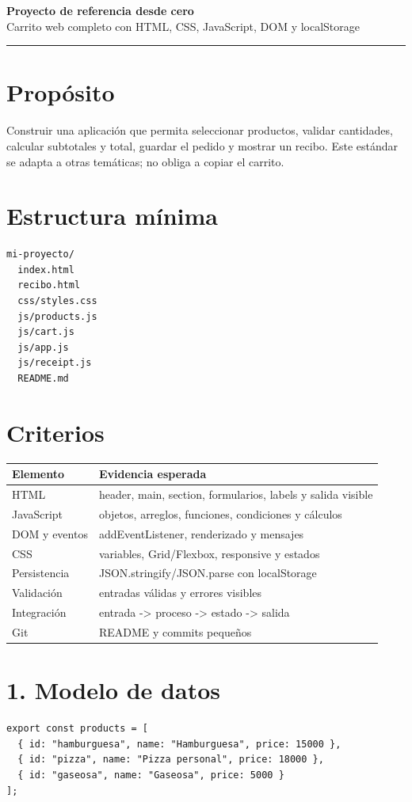 \documentclass[10pt,a4paper]{article}
\newcommand{\ruleline}{\par\noindent\color{line}\rule{\linewidth}{0.6pt}\color{black}\par}
\begin{document}
\begin{center}
{\color{navy}\Large\bfseries Proyecto de referencia desde cero}\\[2mm]
{\small Carrito web completo con HTML, CSS, JavaScript, DOM y localStorage}
\end{center}
\ruleline

\section*{Propósito}
Construir una aplicación que permita seleccionar productos, validar cantidades, calcular subtotales y total, guardar el pedido y mostrar un recibo. Este estándar se adapta a otras temáticas; no obliga a copiar el carrito.
\section*{Estructura mínima}
\begin{lstlisting}
mi-proyecto/
  index.html
  recibo.html
  css/styles.css
  js/products.js
  js/cart.js
  js/app.js
  js/receipt.js
  README.md
\end{lstlisting}
\section*{Criterios}
\begin{tabularx}{\linewidth}{>{\raggedright\arraybackslash}X X}
\toprule
\textbf{Elemento} & \textbf{Evidencia esperada}\\\midrule
HTML & header, main, section, formularios, labels y salida visible\\
JavaScript & objetos, arreglos, funciones, condiciones y cálculos\\
DOM y eventos & addEventListener, renderizado y mensajes\\
CSS & variables, Grid/Flexbox, responsive y estados\\
Persistencia & JSON.stringify/JSON.parse con localStorage\\
Validación & entradas válidas y errores visibles\\
Integración & entrada -> proceso -> estado -> salida\\
Git & README y commits pequeños\\
\bottomrule
\end{tabularx}

\newpage
\section*{1. Modelo de datos}
\begin{lstlisting}
export const products = [
  { id: "hamburguesa", name: "Hamburguesa", price: 15000 },
  { id: "pizza", name: "Pizza personal", price: 18000 },
  { id: "gaseosa", name: "Gaseosa", price: 5000 }
];
\end{lstlisting}
\end{document}
